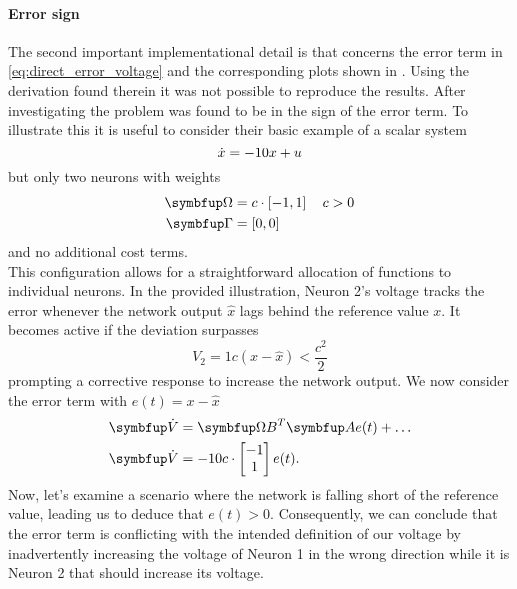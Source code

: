 \paragraph{Error sign}
The second important implementational detail is that concerns the error term in \cref{eq:direct_error_voltage} and the corresponding plots shown in \cite{huang_spiking_2019}. Using the derivation found therein it was not possible to reproduce the results. After investigating the problem was found to be in the sign of the error term. To illustrate this it is useful to consider their basic example of a scalar system
\begin{equation}
	\dot{x} = -10 x + u\\
\end{equation}
but only two neurons with weights
\begin{equation}
\begin{aligned}
\bmu{\Omega} &= c\cdot\left[-1 , 1\right] \quad c>0\\
\bmu{\Gamma} &= \left[0,0\right]
\end{aligned}
\end{equation}
and no additional cost terms.\\
This configuration allows for a straightforward allocation of functions to individual neurons. In the provided illustration, Neuron 2's voltage tracks the error whenever the network output $\hat{x}$ lags behind the reference value $x$. It becomes active if the deviation surpasses
\begin{equation}
	V_2 = 1c\left(x-\hat{x} \right) < \frac{c^2}{2}
\end{equation}
prompting a corrective response to increase the network output.
We now consider the error term with $e(t) = x-\hat{x}$
\begin{equation}
\begin{aligned}
	\bmu{\dot{V}}&= \bmu{\Omega B}^T \bmu{A}e(t) + \dots\\
	\bmu{\dot{V}}&=  -10c \cdot\begin{bmatrix}-1\\1\end{bmatrix}e(t).
\end{aligned}
\end{equation}
Now, let's examine a scenario where the network is falling short of the reference value, leading us to deduce that $e(t)>0$. Consequently, we can conclude that the error term is conflicting with the intended definition of our voltage by inadvertently increasing the voltage of Neuron 1 in the wrong direction while it is Neuron 2 that should increase its voltage.\\
